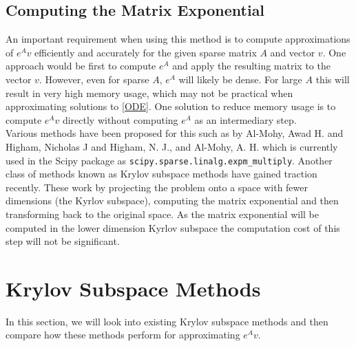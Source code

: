 \documentclass{article}
\begin{document}
\subsection{Computing the Matrix Exponential}
An important requirement when using this method is to compute approximations of $e^{A}v$ efficiently and accurately for the given sparse matrix $A$ and vector $v$.
One approach would be first to compute $e^A$ and apply the resulting matrix to the vector $v$.
However, even for sparse $A$, $e^{A}$ will likely be dense. For large $A$ this will result in very high memory usage, which may not be practical when approximating solutions to \eqref{ODE}.
One solution to reduce memory usage is to compute $e^{A}v$ directly without computing $e^{A}$ as an intermediary step.\\
Various methods have been proposed for this such as by Al-Mohy, Awad H. and Higham, Nicholas J\cite{AlMohy2011} and Higham, N. J., and Al-Mohy, A. H. \cite{Higham2010} which is currently used in the Scipy package as \verb|scipy.sparse.linalg.expm_multiply|.
Another class of methods known as Krylov subspace methods have gained traction recently\cite{Moler2003}.
These work by projecting the problem onto a space with fewer dimensions (the Kyrlov subspace), computing the matrix exponential and then transforming back to the original space.
As the matrix exponential will be computed in the lower dimension Kyrlov subspace the computation cost of this step will not be significant.

\section{Krylov Subspace Methods}
In this section, we will look into existing Krylov subspace methods and then compare how these methods perform for approximating $e^{A}v$.
\end{document}
